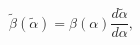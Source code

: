\begin{equation}\label{GL_And_Beta}
\tilde\beta(\tilde\alpha) = \beta(\alpha)\frac{d\tilde\alpha}{d\alpha},
\end{equation}

